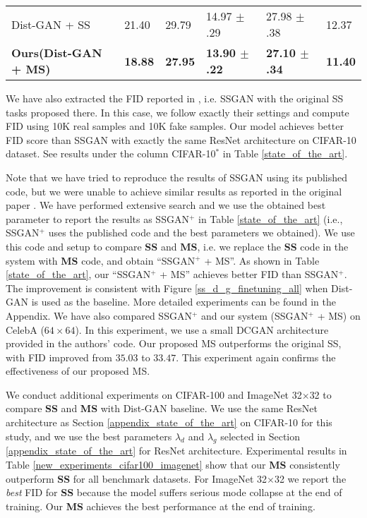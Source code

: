 \documentclass{article}
\begin{document}
\begin{table}
\begin{tabular}{llllll}
    Dist-GAN + SS                                     & 21.40  & 29.79 & 14.97 $\pm$ .29 & 27.98 $\pm$ .38 & 12.37 \\ 

    \textbf{Ours(Dist-GAN + MS)}                      & \textbf{18.88}  & \textbf{27.95} & \textbf{13.90 $\pm$ .22} & \textbf{27.10 $\pm$ .34} & \textbf{11.40} \\
    \bottomrule
  \end{tabular}
  \vspace{-0.4cm}
\end{table}


We have also extracted the FID reported in \cite{chen-arxiv-2018}, i.e. SSGAN with the original SS tasks proposed there. In  this case, we follow exactly their settings and compute FID using 10K real samples and 10K fake samples. Our model achieves better FID score than SSGAN with exactly the same ResNet architecture on CIFAR-10 dataset.  See results under the column CIFAR-10$^*$ in Table \ref{state_of_the_art}.

Note that we have tried to reproduce the results of SSGAN 
using its published code, but we were unable to achieve similar results as reported in the original paper \cite{chen-arxiv-2018}. 
We have performed extensive search and we use the obtained best parameter to report the results as 
SSGAN$^+$ in Table \ref{state_of_the_art} (i.e., SSGAN$^+$ uses the published code and the best parameters we obtained). 
We use this code and setup to 
compare 
{\bf SS}  and {\bf MS}, i.e. we replace the {\bf SS} code in the system with {\bf MS} code, and obtain 
``SSGAN$^+$ + MS''. As shown in Table \ref{state_of_the_art}, our ``SSGAN$^+$ + MS'' achieves better FID than  SSGAN$^+$. 
The improvement is consistent with Figure \ref{ss_d_g_finetuning_all} when Dist-GAN is used as the baseline.
More detailed experiments can be found in the Appendix. 
We have also compared SSGAN$^+$ and our system (SSGAN$^+$ + MS) on CelebA ($64 \times 64$). In this experiment, we use a small DCGAN architecture provided in the authors' code. Our proposed MS outperforms the original SS, with FID improved  
from $35.03$ to $33.47$. This experiment  again confirms the effectiveness of our proposed MS.


We conduct additional experiments on CIFAR-100 and ImageNet 32$\times$32 to compare \textbf{SS} and \textbf{MS} with Dist-GAN baseline. We use the same ResNet architecture as Section \ref{appendix_state_of_the_art} on CIFAR-10 for this study, and we use the best parameters $\lambda_d$ and $\lambda_g$ selected in Section \ref{appendix_state_of_the_art} for ResNet architecture. Experimental results in Table  \ref{new_experiments_cifar100_imagenet} show that our \textbf{MS} consistently outperform \textbf{SS} for  all benchmark datasets. For ImageNet 32$\times$32 we report the \textit{best} FID for \textbf{SS} because the model suffers serious mode collapse at the end of training. Our \textbf{MS} achieves the best performance at the end of training.
\end{document}
